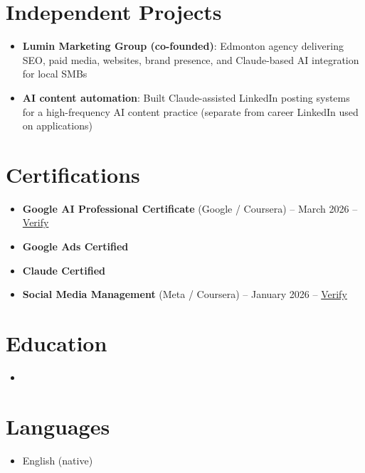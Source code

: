 \documentclass[11pt,a4paper,sans]{moderncv}
\begin{document}
\section{Independent Projects}
\vspace{1pt}
\begin{itemize}
\item \textbf{Lumin Marketing Group (co-founded)}: Edmonton agency delivering SEO, paid media, websites, brand presence, and Claude-based AI integration for local SMBs
\item \textbf{AI content automation}: Built Claude-assisted LinkedIn posting systems for a high-frequency AI content practice (separate from career LinkedIn used on applications)
\end{itemize}

\section{Certifications}
\vspace{1pt}
\begin{itemize}
\item \textbf{Google AI Professional Certificate} (Google / Coursera) -- March 2026 -- \href{https://www.coursera.org/account/accomplishments/verify/professional-cert/54E1P3RBHVL8}{Verify}
\item \textbf{Google Ads Certified}
\item \textbf{Claude Certified}
\item \textbf{Social Media Management} (Meta / Coursera) -- January 2026 -- \href{https://www.coursera.org/account/accomplishments/verify/7NOVGMU2L69G}{Verify}
\end{itemize}

\section{Education}
\vspace{1pt}
\begin{itemize}
\item{}
\end{itemize}

\section{Languages}
\vspace{1pt}
\begin{itemize}
\item English (native)
\end{itemize}
\end{document}
